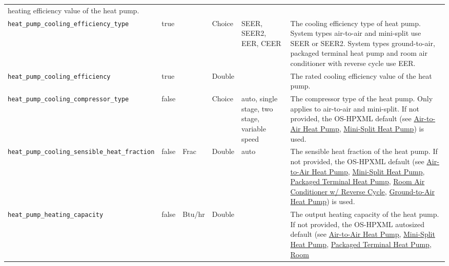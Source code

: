 \begin{longtable}[]{@{}llllll@{}}
heating efficiency value of the heat pump. \\
\texttt{heat\_pump\_cooling\_efficiency\_type} & true & & Choice & SEER,
SEER2, EER, CEER & The cooling efficiency type of heat pump. System
types air-to-air and mini-split use SEER or SEER2. System types
ground-to-air, packaged terminal heat pump and room air conditioner with
reverse cycle use EER. \\
\texttt{heat\_pump\_cooling\_efficiency} & true & & Double & & The rated
cooling efficiency value of the heat pump. \\
\texttt{heat\_pump\_cooling\_compressor\_type} & false & & Choice &
auto, single stage, two stage, variable speed & The compressor type of
the heat pump. Only applies to air-to-air and mini-split. If not
provided, the OS-HPXML default (see
\href{https://openstudio-hpxml.readthedocs.io/en/v1.7.0/workflow_inputs.html\#air-to-air-heat-pump}{Air-to-Air
Heat Pump},
\href{https://openstudio-hpxml.readthedocs.io/en/v1.7.0/workflow_inputs.html\#mini-split-heat-pump}{Mini-Split
Heat Pump}) is used. \\
\texttt{heat\_pump\_cooling\_sensible\_heat\_fraction} & false & Frac &
Double & auto & The sensible heat fraction of the heat pump. If not
provided, the OS-HPXML default (see
\href{https://openstudio-hpxml.readthedocs.io/en/v1.7.0/workflow_inputs.html\#air-to-air-heat-pump}{Air-to-Air
Heat Pump},
\href{https://openstudio-hpxml.readthedocs.io/en/v1.7.0/workflow_inputs.html\#mini-split-heat-pump}{Mini-Split
Heat Pump},
\href{https://openstudio-hpxml.readthedocs.io/en/v1.7.0/workflow_inputs.html\#packaged-terminal-heat-pump}{Packaged
Terminal Heat Pump},
\href{https://openstudio-hpxml.readthedocs.io/en/v1.7.0/workflow_inputs.html\#room-air-conditioner-w-reverse-cycle}{Room
Air Conditioner w/ Reverse Cycle},
\href{https://openstudio-hpxml.readthedocs.io/en/v1.7.0/workflow_inputs.html\#ground-to-air-heat-pump}{Ground-to-Air
Heat Pump}) is used. \\
\texttt{heat\_pump\_heating\_capacity} & false & Btu/hr & Double & & The
output heating capacity of the heat pump. If not provided, the OS-HPXML
autosized default (see
\href{https://openstudio-hpxml.readthedocs.io/en/v1.7.0/workflow_inputs.html\#air-to-air-heat-pump}{Air-to-Air
Heat Pump},
\href{https://openstudio-hpxml.readthedocs.io/en/v1.7.0/workflow_inputs.html\#mini-split-heat-pump}{Mini-Split
Heat Pump},
\href{https://openstudio-hpxml.readthedocs.io/en/v1.7.0/workflow_inputs.html\#packaged-terminal-heat-pump}{Packaged
Terminal Heat Pump},
\href{https://openstudio-hpxml.readthedocs.io/en/v1.7.0/workflow_inputs.html\#room-air-conditioner-w-reverse-cycle}{Room
}
\end{longtable}
